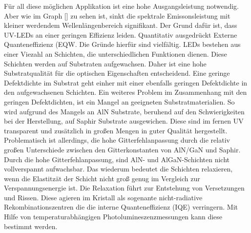Für all diese möglichen Applikation ist eine hohe Ausgangsleistung notwendig. Aber wie im Graph [] zu sehen ist, sinkt die spektrale Emissonsleistung mit kleiner werdendem Wellenlängenbereich signifikant. Der Grund dafür ist, dass UV-LEDs an einer geringen Effizienz leiden. Quantitativ ausgedrückt Externe Quanteneffizienz (EQW. Die Gründe hierfür sind vielfältig. LEDs bestehen aus einer Viezahl an Schichten, die unterschiedlichen Funktionen dienen. Diese Schichten werden auf Substraten aufgewachsen. Daher ist eine hohe Substratqualität für die optischen Eigenschaften entscheidend. Eine geringe Defektdichte im Substrat geht einher mit einer ebenfalls geringen Defektdichte in den aufgewachsenen Schichten. Ein weiteres Problem im Zusammenhang mit den geringen Defektdichten, ist ein Mangel an geeigneten Substratmaterialien. So wird aufgrund des Mangels an AlN Substrate, beruhend auf den Schwierigkeiten bei der Herstellung, auf Saphir Substrate ausgewichen. Diese sind im fernen UV transparent und zusätzlich in großen Mengen in guter Qualität hergestellt.
Problematisch ist allerdings, die hohe Gitterfehlanpassung durch die relativ großen Unterschiede zwischen den Gitterkonstanten von AlN/GaN und Saphir.
Durch die hohe Gitterfehlanpassung, sind AlN- und AlGaN-Schichten nicht vollverspannt aufwachsbar. Das wiederum bedeutet die Schichten relaxieren, wenn die Elastitzät der Schicht nicht groß genug im Vergleich zur Verspannungsenergie ist. Die Relaxation führt zur Entstehung von Versetzungen und Rissen. Diese agieren im Kristall als sogenante nicht-radiative Rekombinationszentren
die die interne Quanteneffizienz (IQE) verringern. Mit Hilfe von temperaturabhängigen Photolumineszenzmessungen kann diese bestimmt werden. 









